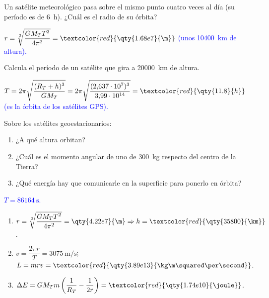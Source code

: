 \begin{exercise}
    Un satélite meteorológico pasa sobre el mismo punto cuatro veces al día (su período es de \qty{6}{h}). ¿Cuál es el radio de
    su órbita?
    \begin{solu}
        \(r = \sqrt[3]{\dfrac{G M_T T^2}{4\pi^2}} = \textcolor{red}{\qty{1.68e7}{\m}}\) \textcolor{blue}{(unos \qty{10400}{\km} de altura).}
    \end{solu}
\end{exercise}

\begin{exercise}
    Calcula el período de un satélite que gira a \qty{20000}{\km} de altura.
    \begin{solu}
        \(T = 2\pi\sqrt{\dfrac{(R_T + h)^3}{G M_T}} = 2\pi\sqrt{\dfrac{(2{,}637\cdot 10^7)^3}{3{,}99\cdot 10^{14}}} = \textcolor{red}{\qty{11.8}{h}}\)
        \textcolor{blue}{(es la órbita de los satélites GPS).}
    \end{solu}
\end{exercise}

\begin{exercise}
    Sobre los satélites geoestacionarios:
    \begin{enumerate}[label=\letraminuscula]
        \item ¿A qué altura orbitan?
        \item ¿Cuál es el momento angular de uno de \qty{300}{\kg} respecto del centro de la Tierra?
        \item ¿Qué energía hay que comunicarle en la superficie para ponerlo en órbita?
    \end{enumerate}
    \begin{solu}
        \textcolor{blue}{\(T = \qty{86164}{\second}\).}
        \begin{enumerate}[label=\letraminuscula]
            \item \(r = \sqrt[3]{\dfrac{G M_T T^2}{4\pi^2}} = \qty{4.22e7}{\m} \Rightarrow h = \textcolor{red}{\qty{35800}{\km}}\).
            \item \(v = \dfrac{2\pi r}{T} = \qty{3075}{\m\per\second}\); \(L = m r v = \textcolor{red}{\qty{3.89e13}{\kg\m\squared\per\second}}\).
            \item \(\Delta E = G M_T m\left(\dfrac{1}{R_T} - \dfrac{1}{2r}\right) = \textcolor{red}{\qty{1.74e10}{\joule}}\).
        \end{enumerate}
    \end{solu}
\end{exercise}

